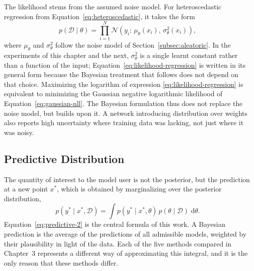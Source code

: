 The likelihood stems from the assumed noise model. For heteroscedastic regression from
Equation~\eqref{eq:heteroscedastic}, it takes the form
%
\begin{equation}
    p(\mathcal{D} \mid \theta)
    = \prod_{i=1}^{N}
      \mathcal{N}\!\left(y_i;\, \mu_\theta(x_i),\, \sigma^2_\theta(x_i)\right),
    \label{eq:likelihood-regression}
\end{equation}
%
where $\mu_\theta$ and $\sigma^2_\theta$ follow the noise model of
Section~\ref{subsec:aleatoric}. In the experiments of this chapter and the next,
$\sigma^2_\theta$ is a single learnt constant rather than a function of the
input; Equation~\eqref{eq:likelihood-regression} is written in its general form
because the Bayesian treatment that follows does not depend on that choice. Maximizing the logarithm of expression
\eqref{eq:likelihood-regression} is equivalent to minimizing the Gaussian negative
logarithmic likelihood of Equation~\eqref{eq:gaussian-nll}. The Bayesian formulation thus does
not replace the noise model, but builds upon it. A network introducing distribution over
weights also reports high uncertainty where training data was lacking, not just where it was
noisy.

\subsection{Predictive Distribution}
\label{subsec:predictive-distribution}

The quantity of interest to the model user is not the posterior, but the
prediction at a new point $x^\ast$, which is obtained by marginalizing over the posterior
distribution,
%
\begin{equation}
    p(y^\ast \mid x^\ast, \mathcal{D})
    = \int p(y^\ast \mid x^\ast, \theta)\,
            p(\theta \mid \mathcal{D})\; \mathrm{d}\theta .
    \label{eq:predictive-2}
\end{equation}
%
Equation~\eqref{eq:predictive-2} is the central formula of this work. A Bayesian prediction
is the average of the predictions of all admissible models, weighted by their plausibility in
light of the data. Each of the five methods compared in Chapter~3 represents a different way
of approximating this integral, and it is the only reason that these methods differ.

